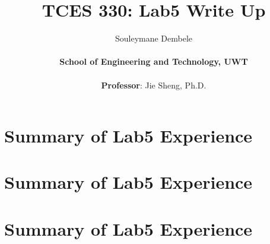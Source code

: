 \documentclass{article}
\title{\textbf{TCES 330: Lab5 Write Up}}
\author{Souleymane Dembele \\ \\ \textbf{School of Engineering and Technology, UWT} \\  \\ \textbf{Professor}:  Jie Sheng, Ph.D.}
\begin{document}
\maketitle
\tableofcontents

\section*{Summary of Lab5 Experience}
\section*{Summary of Lab5 Experience}
\section*{Summary of Lab5 Experience}
\end{document}

